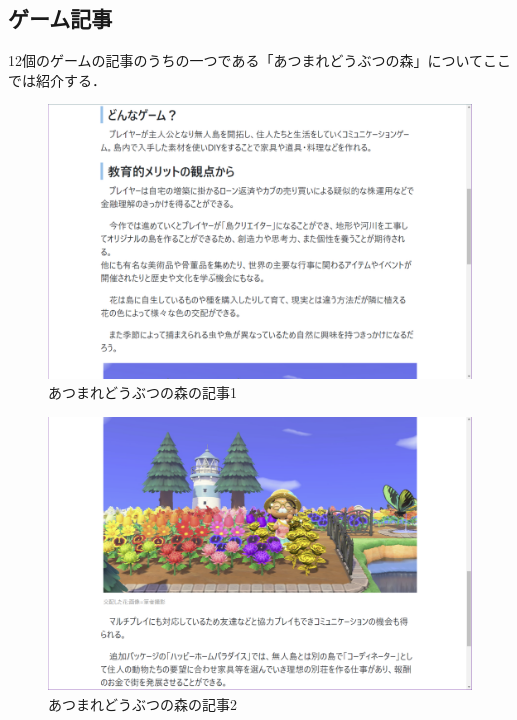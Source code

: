 \documentclass[12pt,a4j,titlepage]{ltjsarticle}
\begin{document}
\subsection{ゲーム記事}
12個のゲームの記事のうちの一つである「あつまれどうぶつの森」についてここでは紹介する．


\vspace{1zh}
\begin{figure}[H]
\begin{center}
 \includegraphics[keepaspectratio, scale=0.35]{あつ森1.pdf}
\end{center}
 \caption{あつまれどうぶつの森の記事1}
 \label{fig:あつ森1}
\end{figure}

\vspace{1zh}
\begin{figure}[H]
\begin{center}
 \includegraphics[keepaspectratio, scale=0.35]{あつ森2.pdf}
\end{center}
 \caption{あつまれどうぶつの森の記事2}
 \label{fig:あつ森2}
\end{figure}
\end{document}

